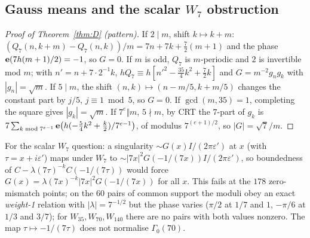 \subsection{Gauss means and the scalar $W_7$ obstruction}\label{sec:gauss}
\begin{proof}[Proof of Theorem~\ref{thm:D} (pattern)]
If $2\mid m$, shift $k\mapsto k+m$: $(Q_7(n,k+m)-Q_7(n,k))/m=7n+7k+\tfrac72(m+1)$ and the phase $\mathbf{e}(7h(m+1)/2)=-1$, so $G=0$. If $m$ is odd,
$Q_7$ is $m$-periodic and $2$ is invertible mod $m$; with $n'=n+7\cdot2^{-1}k$, $hQ_7\equiv h[n'^2-\tfrac{35}4k^2+\tfrac72k]$ and
$G=m^{-2}g_ng_k$ with $|g_n|=\sqrt m$. If $5\mid m$, the shift $(n,k)\mapsto(n-m/5,k+m/5)$ changes the constant part by $j/5$, $j\equiv1\bmod5$,
so $G=0$. If $\gcd(m,35)=1$, completing the square gives $|g_k|=\sqrt m$. If $7^e\Vert m$, $5\nmid m$, by CRT the $7$-part of $g_k$ is $7\sum_{k\bmod 7^{e-1}}\mathbf{e}\bigl(h(-\tfrac54k^2+\tfrac k2)/7^{e-1}\bigr)$, of modulus $7^{(e+1)/2}$,
so $|G|=\sqrt7/m$.
\end{proof}

For the scalar $W_7$ question: a singularity $\sim G(x)I/(2\pi\varepsilon')$ at $x$ (with $\tau=x+i\varepsilon'$) maps under
$W_7$ to $\sim|7x|^2G(-1/(7x))I/(2\pi\varepsilon')$, so boundedness of $C-\lambda(7\tau)^{-k}C(-1/(7\tau))$ would force
$G(x)=\lambda(7x)^{-k}|7x|^2G(-1/(7x))$ for all $x$. This fails at the $178$ zero-mismatch points; on the $60$ pairs of common support the
moduli obey an exact \emph{weight-1} relation with $|\lambda|=7^{-1/2}$ but the phase varies ($\pi/2$ at $1/7$ and $1$, $-\pi/6$ at $1/3$ and
$3/7$); for $W_{35},W_{70},W_{140}$ there are no pairs with both values nonzero. The map $\tau\mapsto-1/(7\tau)$ does not normalise $\Gamma_0(70)$.

